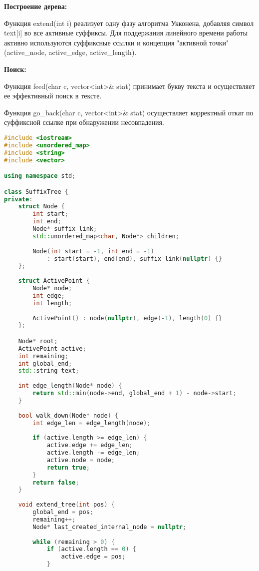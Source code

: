 {\bfseries Построение дерева:}

Функция extend(int i) реализует одну фазу алгоритма Укконена, добавляя
символ text[i] во все активные суффиксы. Для поддержания линейного времени работы активно используются суффиксные ссылки и концепция "активной точки"(active\_node, active\_edge, active\_length).

{\bfseries Поиск:}

Функция feed(char c, vector<int>\& stat) принимает  букву текста и осуществляет ее эффективный поиск в тексте.

Функция go\_back(char c, vector<int>\& stat) осуществляет корректный откат по суффиксной ссылке при обнаружении несовпадения.

\begin{lstlisting}[language=C++]
#include <iostream>
#include <unordered_map>
#include <string>
#include <vector>

using namespace std;

class SuffixTree {
private:
    struct Node {
        int start;
        int end;
        Node* suffix_link;
        std::unordered_map<char, Node*> children;
        
        Node(int start = -1, int end = -1) 
            : start(start), end(end), suffix_link(nullptr) {}
    };
    
    struct ActivePoint {
        Node* node;
        int edge;
        int length;
        
        ActivePoint() : node(nullptr), edge(-1), length(0) {}
    };

    Node* root;
    ActivePoint active;
    int remaining;
    int global_end;
    std::string text;
    
    int edge_length(Node* node) {
        return std::min(node->end, global_end + 1) - node->start;
    }
    
    bool walk_down(Node* node) {
        int edge_len = edge_length(node);
        
        if (active.length >= edge_len) {
            active.edge += edge_len;
            active.length -= edge_len;
            active.node = node;
            return true;
        }
        return false;
    }
    
    void extend_tree(int pos) {
        global_end = pos;
        remaining++;
        Node* last_created_internal_node = nullptr;
        
        while (remaining > 0) {
            if (active.length == 0) {
                active.edge = pos;
            }
            

\end{lstlisting}
